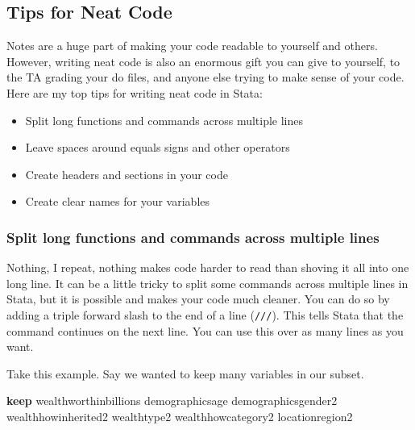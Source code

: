 \documentclass[
]{book}
\newenvironment{Shaded}{\begin{snugshade}}{\end{snugshade}}
\newcommand{\KeywordTok}[1]{\textcolor[rgb]{0.13,0.29,0.53}{\textbf{#1}}}
\newcommand{\NormalTok}[1]{#1}
\providecommand{\tightlist}{%
  \setlength{\itemsep}{0pt}\setlength{\parskip}{0pt}}
\begin{document}
\hypertarget{tips-for-neat-code}{%
\subsection*{Tips for Neat Code}\label{tips-for-neat-code}}

Notes are a huge part of making your code readable to yourself and others. However, writing neat code is also an enormous gift you can give to yourself, to the TA grading your do files, and anyone else trying to make sense of your code. Here are my top tips for writing neat code in Stata:

\begin{itemize}
\tightlist
\item
  Split long functions and commands across multiple lines
\item
  Leave spaces around equals signs and other operators
\item
  Create headers and sections in your code
\item
  Create clear names for your variables
\end{itemize}

\hypertarget{split-long-functions-and-commands-across-multiple-lines}{%
\subsubsection*{Split long functions and commands across multiple lines}\label{split-long-functions-and-commands-across-multiple-lines}}

Nothing, I repeat, nothing makes code harder to read than shoving it all into one long line. It can be a little tricky to split some commands across multiple lines in Stata, but it is possible and makes your code much cleaner. You can do so by adding a triple forward slash to the end of a line (\texttt{///}). This tells Stata that the command continues on the next line. You can use this over as many lines as you want.

Take this example. Say we wanted to keep many variables in our subset.

\begin{Shaded}
\begin{Highlighting}[]
\KeywordTok{keep}\NormalTok{ wealthworthinbillions demographicsage demographicsgender2 wealthhowinherited2 wealthtype2 wealthhowcategory2 locationregion2}
\end{Highlighting}
\end{Shaded}
\end{document}
